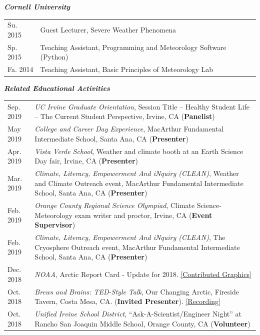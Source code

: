 \documentclass[margin,line,palatino,courier,10pt]{res}
\begin{document}
\begin{resume}
\newpage
\textit{\textbf{Cornell University}}
\vspace*{0.05in}\\
\begin{tabular}{@{}p{0.9in}p{4in}}
Su. 2015 & Guest Lecturer, Severe Weather Phenomena\\
Sp. 2015 & Teaching Assistant, Programming and Meteorology Software (Python)\\
Fa. 2014 & Teaching Assistant, Basic Principles of Meteorology Lab\\
\end{tabular}

\textit{\textbf{Related Educational Activities}}
\vspace*{0.05in}\\
\begin{tabular}{@{}p{0.9in}p{4in}}
Sep. 2019 & \textit{UC Irvine Graduate Orientation}, Session Title -- Healthy Student Life -- The Current Student Perspective, Irvine, CA (\textbf{Panelist})\\
May 2019 & \textit{College and Career Day Experience}, MacArthur Fundamental Intermediate School, Santa Ana, CA (\textbf{Presenter})\\
Apr. 2019 & \textit{Vista Verde School}, Weather and climate booth at an Earth Science Day fair, Irvine, CA (\textbf{Presenter})\\
Mar. 2019 & \textit{Climate, Literacy, Empowerment And iNquiry (CLEAN)}, Weather and Climate Outreach event, MacArthur Fundamental Intermediate School, Santa Ana, CA (\textbf{Presenter})\\
Feb. 2019 & \textit{Orange County Regional Science Olympiad}, Climate Science-Meteorology exam writer and proctor, Irvine, CA (\textbf{Event Supervisor})\\
Feb. 2019 & \textit{Climate, Literacy, Empowerment And iNquiry (CLEAN)}, The Cryosphere Outreach event, MacArthur Fundamental Intermediate School, Santa Ana, CA (\textbf{Presenter})\\
Dec. 2018 & \textit{NOAA}, Arctic Report Card - Update for 2018. \href{https://www.youtube.com/watch?v=XntO9a-NpeM}{[Contributed Graphics]}\\
Oct. 2018 & \textit{Brews and Brains: TED-Style Talk}, Our Changing Arctic, Fireside Tavern, Costa Mesa, CA. (\textbf{Invited Presenter}). \href{https://www.youtube.com/watch?v=A5qQpDtOdvg}{[Recording]}\\
Oct. 2018 & \textit{Unified Irvine School District}, ``Ask-A-Scientist/Engineer Night'' at Rancho San Joaquin Middle School, Orange County, CA (\textbf{Volunteer})\\

\end{tabular}
\end{resume}
\end{document}
